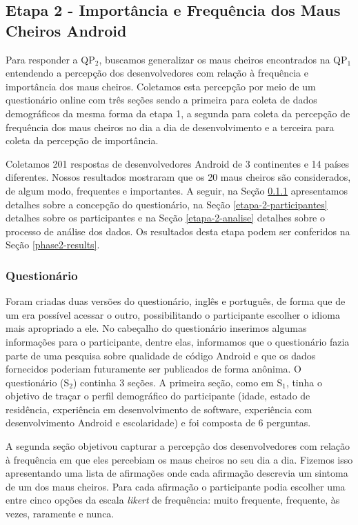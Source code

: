\subsection{Etapa 2 - Importância e Frequência dos Maus Cheiros Android}



Para responder a QP$_2$, buscamos generalizar os maus cheiros encontrados na QP$_1$ entendendo a percepção dos desenvolvedores com relação à frequência e importância dos maus cheiros. Coletamos esta percepção por meio de um questionário online com três seções sendo a primeira para coleta de dados demográficos da mesma forma da etapa 1, a segunda para coleta da percepção de frequência dos maus cheiros no dia a dia de desenvolvimento e a terceira para coleta da percepção de importância. 

Coletamos 201 respostas de desenvolvedores Android de 3 continentes e 14 países diferentes. Nossos resultados mostraram que os 20 maus cheiros são considerados, de algum modo, frequentes e importantes. A seguir, na Seção \ref{etapa-2-questionario} apresentamos detalhes sobre a concepção do questionário, na Seção \ref{etapa-2-participantes} detalhes sobre os participantes e na Seção \ref{etapa-2-analise} detalhes sobre o processo de análise dos dados. Os resultados desta etapa podem ser conferidos na Seção \ref{phase2-results}.

\subsubsection{Questionário}
\label{etapa-2-questionario}

Foram criadas duas versões do questionário, inglês e português, de forma que de um era possível acessar o outro, possibilitando o participante escolher o idioma mais apropriado a ele. No cabeçalho do questionário inserimos algumas informações para o participante, dentre elas, informamos que o questionário fazia parte de uma pesquisa sobre qualidade de código Android e que os dados fornecidos poderiam futuramente ser publicados de forma anônima. O questionário (S$_2$) continha 3 seções. A primeira seção, como em S$_1$, tinha o objetivo de traçar o perfil demográfico do participante (idade, estado de residência, experiência em desenvolvimento de software, experiência com desenvolvimento Android e escolaridade) e foi composta de 6 perguntas. 

A segunda seção objetivou capturar a percepção dos desenvolvedores com relação à frequência em que eles percebiam os maus cheiros no seu dia a dia. Fizemos isso apresentando uma lista de afirmações onde cada afirmação descrevia um sintoma de um dos maus cheiros. Para cada afirmação o participante podia escolher uma entre cinco opções da escala \textit{likert} de frequência: muito frequente, frequente, às vezes, raramente e nunca. 

